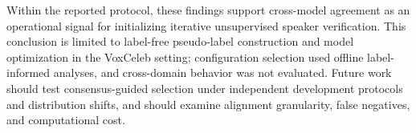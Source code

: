 \documentclass[journal]{IEEEtran}
\begin{document}
Within the reported protocol, these findings support cross-model agreement
as an operational signal for initializing iterative unsupervised speaker
verification. This conclusion is limited to label-free pseudo-label
construction and model optimization in the VoxCeleb setting; configuration
selection used offline label-informed analyses, and cross-domain behavior
was not evaluated. Future work should test consensus-guided selection under
independent development protocols and distribution shifts, and should
examine alignment granularity, false negatives, and computational cost.

\nocite{*}






 







\vfill
\end{document}
